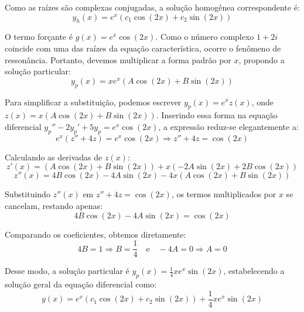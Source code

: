 \documentclass[oneside,12pt,a4paper]{report}
\begin{document}
\begin{resolucao}
    Como as raízes são complexas conjugadas, a solução homogênea correspondente é:
    \[y_h(x) = e^x(c_1 \cos(2x) + c_2 \sin(2x))\]

    O termo forçante é $g(x) = e^x \cos(2x)$. Como o número complexo $1 + 2i$ coincide com uma das raízes da equação característica, ocorre o fenômeno de ressonância. Portanto, devemos multiplicar a forma padrão por $x$, propondo a solução particular:
    \[y_p(x) = x e^x (A \cos(2x) + B \sin(2x))\]

    Para simplificar a substituição, podemos escrever $y_p(x) = e^x z(x)$, onde $z(x) = x(A\cos(2x) + B\sin(2x))$. Inserindo essa forma na equação diferencial $y_p'' - 2y_p' + 5y_p = e^x \cos(2x)$, a expressão reduz-se elegantemente a:
    \[e^x(z'' + 4z) = e^x \cos(2x) \Rightarrow z'' + 4z = \cos(2x)\]

    Calculando as derivadas de $z(x)$:
    \[z'(x) = (A\cos(2x) + B\sin(2x)) + x(-2A\sin(2x) + 2B\cos(2x))\]
    \[z''(x) = 4B\cos(2x) - 4A\sin(2x) - 4x(A\cos(2x) + B\sin(2x))\]

    Substituindo $z''(x)$ em $z'' + 4z = \cos(2x)$, os termos multiplicados por $x$ se cancelam, restando apenas:
    \[4B\cos(2x) - 4A\sin(2x) = \cos(2x)\]

    Comparando os coeficientes, obtemos diretamente:
    \[4B = 1 \Rightarrow B = \frac{1}{4} \quad \text{e} \quad -4A = 0 \Rightarrow A = 0\]

    Desse modo, a solução particular é $\boxed{y_p(x) = \frac{1}{4}xe^x\sin(2x)}$, estabelecendo a solução geral da equação diferencial como:
    \[\boxed{y(x) = e^x(c_1 \cos(2x) + c_2 \sin(2x)) + \frac{1}{4}xe^x\sin(2x)}\]
\end{resolucao}
\end{document}
